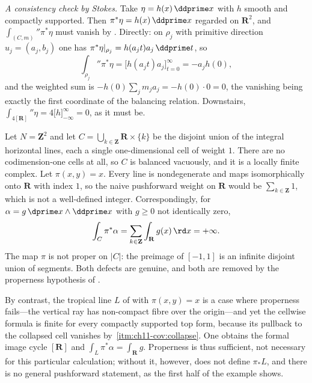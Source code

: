 \begin{example}
\emph{A consistency check by Stokes.}  Take
$\eta=h(x)\,\ddprime x$ with $h$ smooth and compactly supported.  Then
$\pi^*\eta=h(x)\,\ddprime x$ regarded on $\mathbf R^2$, and
$\int_{(C,m)}\dprime\pi^*\eta$ must vanish by
.  Directly: on $\rho_j$ with primitive direction
$u_j=(a_j,b_j)$ one has $\pi^*\eta|_{\rho_j}=h(a_jt)a_j\,\ddprime t$, so
\[
 \int_{\rho_j}\dprime\pi^*\eta
 =\bigl[h(a_jt)a_j\bigr]_{t=0}^{\infty}=-a_jh(0),
\]
and the weighted sum is $-h(0)\sum_jm_ja_j=-h(0)\cdot0=0$, the vanishing
being exactly the first coordinate of the balancing relation.  Downstairs,
$\int_{4[\mathbf R]}\dprime\eta=4\bigl[h\bigr]_{-\infty}^{\infty}=0$, as it
must be.
\end{example}

\begin{example}
\label{ex:ch11-pushforward-nonproper}
Let $N=\mathbf Z^2$ and let $C=\bigcup_{k\in\mathbf Z}\mathbf R\times\{k\}$
be the disjoint union of the integral horizontal lines, each a single
one-dimensional cell of weight $1$.  There are no codimension-one cells at
all, so $C$ is balanced vacuously, and it is a locally finite complex.  Let
$\pi(x,y)=x$.  Every line is nondegenerate and maps isomorphically onto
$\mathbf R$ with index $1$, so the naive pushforward weight on $\mathbf R$
would be $\sum_{k\in\mathbf Z}1$, which is not a well-defined integer.
Correspondingly, for $\alpha=g\,\dprime x\wedge\ddprime x$ with
$g\ge0$ not identically zero,
\[
 \int_C\pi^*\alpha=\sum_{k\in\mathbf Z}\int_{\mathbf R}g(x)\,\rd x=+\infty .
\]
The map $\pi$ is not proper on $|C|$: the preimage of $[-1,1]$ is an
infinite disjoint union of segments.  Both defects are genuine, and both are
removed by the properness hypothesis of
.

By contrast, the tropical line $L$ of
 with $\pi(x,y)=x$ is a case where
properness fails---the vertical ray has non-compact fibre over the
origin---and yet the cellwise formula is finite for every compactly supported
top form, because its pullback to the collapsed cell vanishes by
\,\cref{itm:ch11-cov:collapse}.  One
obtains the formal image cycle $[\mathbf R]$ and
$\int_L\pi^*\alpha=\int_{\mathbf R}g$.  Properness is thus sufficient, not
necessary for this particular calculation; without it, however,
 does not define $\pi_*L$, and there is no
general pushforward statement, as the first half of the example shows.
\end{example}

